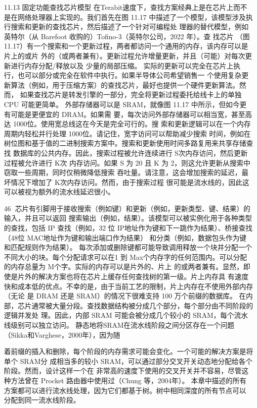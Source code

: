 11.13 固定功能查找芯片模型
在Terabit速度下，查找方案经典上是在芯片上而不是在网络处理器上实现的。我们首先在图
11.17 中描述了一个模型，该模型涉及执行搜索和更新的查找芯片，然后描述了一个针对可编程处
理器的替代模型，例如英特尔（从 Barefoot 收购的）Tofino-3（英特尔公司，2022 年）。查
找芯片
（图 11.17）有一个搜索和一个更新过程，两者都访问一个通用的内存，该内存可以是片上的或片
外的（或两者兼有）。更新过程允许增量更新，并且（可能）对每次更新进行内存分配/释放以及
少量的局部压缩。
实际的更新可以完全在芯片上执行，也可以部分或完全在软件中执行。如果半导体公司希望销售一
个使用复杂更新算法（例如，用于压缩方案）的查找芯片，最好也提供一个硬件更新算法。然而，
如果查找芯片是转发引擎的一部分，完全将更新过程委托给线卡上的单独 CPU 可能更简单。
外部存储器可以是 SRAM，就像图 11.17 中所示，但如今更有可能是更便宜的 DRAM。如果需
要，每次访问外部存储器可以相当宽，甚至高达 1000位。使用宽总线这在今天是完全可行的。搜
索和更新逻辑可以在一个内存周期内轻松并行处理 1000位。请记住，宽字访问可以帮助减少搜索
时间，例如在树位图和基于值的二进制搜索方案中。搜索和更新使用时间多路复用来共享存储查找
数据库的公共内存。因此，搜索过程被允许连续进行 S次内存访问，然后更新过程被允许进行 K次
内存访问。如果 S 为 20 且 K 为 2，则这允许更新从搜索中窃取一些周期，同时仅稍微降低搜索
吞吐量。请注意，这会增加搜索的延迟，最坏情况下增加了 K次内存访问。然而，由于搜索过程
很可能是流水线的，因此这可以被视为额外的流水线延迟很小。


                                                   46
芯片有引脚用于接收搜索（例如键）和更新（例如，更新类型、键、结果）的输入，并且可以返回
搜索输出（例如，结果）。该模型可以被实例化用于各种类型的查找，包括 IP 查找（例如，32
位 IP地址作为键和下一跳作为结果）、桥接查找（48位 MAC地址作为键和输出端口作为结果）
和分类（例如，数据包头作为键和匹配规则作为结果）。
每次添加或删除键都可能导致调用释放一个块并分配一个不同大小的块。每个分配请求可以在1
到 Max个内存字的任何范围内。可以分配的内存总量为 M个字。实际的内存可以是片外的、片上
的或两者兼有。显然，即使是片外的解决方案也将在芯片上缓存任何查找树的第一级。片上内存具
有速度快和成本低的优点。不幸的是，由于当前工艺的限制，片上内存在不使用外部内存（无论
是 DRAM 还是 SRAM）的情况下很难支持 100 万个前缀的数据库。
在内部，芯片通常被大量分段。查找数据结构被分成几个部分，每个部分由不同阶段的逻辑并发处
理。因此，内部 SRAM 可能会被分成几个较小的 SRAM，每个流水线级别可以独立访问。
静态地将SRAM在流水线阶段之间分区存在一个问题（Sikka和Varghese，2000年），因为随



着前缀的插入和删除，每个阶段的内存需求可能会变化。一个可能的解决方案是将单个 SRAM分
成相当多的较小 SRAM，可以通过部分交叉开关动态地分配给各个阶段。然而，设计这样一个在
非常高的速度下使用的交叉开关并不容易，尽管这种方法曾在 Procket 路由器中使用过（Chung
等，2004年）。
本章中描述的所有方案都可以进行流水线处理，因为它们都基于树。树中相同深度的所有节点可以
分配到同一流水线阶段。



